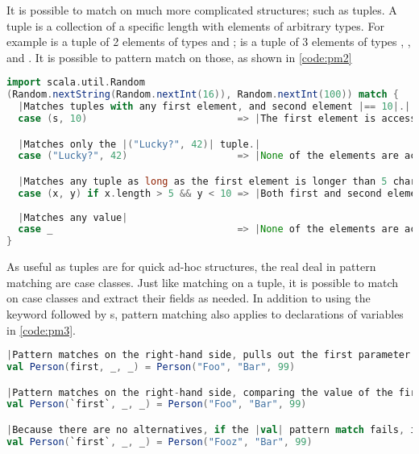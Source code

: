 \documentclass[10 pt]{article}
\begin{document}
It is possible to match on much more complicated structures; such as tuples. A tuple is a collection of a specific length with elements of arbitrary types. For example  is a tuple of 2 elements of types  and ;  is a tuple of 3 elements of types , , and . It is possible to pattern match on those, as shown in \autoref{code:pm2}

\begin{lstlisting}[caption={Pattern matching II}, label={code:pm2}, language=Scala, escapechar=|]
import scala.util.Random
(Random.nextString(Random.nextInt(16)), Random.nextInt(100)) match {
  |Matches tuples with any first element, and second element |== 10|.|
  case (s, 10)                          => |The first element is accessible as |s| here.|

  |Matches only the |("Lucky?", 42)| tuple.|
  case ("Lucky?", 42)                   => |None of the elements are accessible here.|

  |Matches any tuple as long as the first element is longer than 5 characters and second element is less than 10.|
  case (x, y) if x.length > 5 && y < 10 => |Both first and second elements are accessible as |x| and |y|.|
  
  |Matches any value|
  case _                                => |None of the elements are accessible here.|
}
\end{lstlisting}

As useful as tuples are for quick ad-hoc structures, the real deal in pattern matching are case classes. Just like matching on a tuple, it is possible to match on case classes and extract their fields as needed. In addition to using the  keyword followed by s, pattern matching also applies to declarations of variables in \autoref{code:pm3}.

\begin{lstlisting}[caption={Pattern matching III}, label={code:pm3}, language=Scala, escapechar=|]
|Pattern matches on the right-hand side, pulls out the first parameter as |val first: String|.|
val Person(first, _, _) = Person("Foo", "Bar", 99)

|Pattern matches on the right-hand side, comparing the value of the first parameter to be equal to in-scope variable |first|. (Notice the backticks.)|
val Person(`first`, _, _) = Person("Foo", "Bar", 99)

|Because there are no alternatives, if the |val| pattern match fails, it raises an exception.|
val Person(`first`, _, _) = Person("Fooz", "Bar", 99)
\end{lstlisting}
\end{document}
